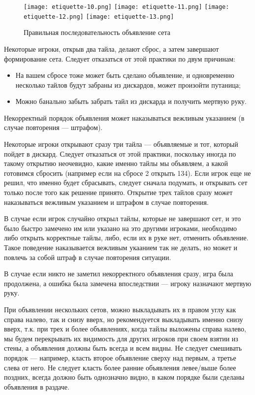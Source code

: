 \begin{figure}[H]
	\centering
	\texttt{[image: etiquette-10.png]}
	\texttt{[image: etiquette-11.png]}
	\texttt{[image: etiquette-12.png]}
	\texttt{[image: etiquette-13.png]}
	\caption{Правильная последовательность объявление сета}
\end{figure}

Некоторые игроки, открыв два тайла, делают сброс, а затем завершают формирование сета. Следует отказаться от этой практики по двум причинам:
\begin{itemize}
	\item На вашем сбросе тоже может быть сделано объявление, и одновременно несколько тайлов будут забраны из дискардов, может произойти путаница;
	\item Можно банально забыть забрать тайл из дискарда и получить мертвую руку.
\end{itemize}

Некорректный порядок объявления может наказываться вежливым указанием (в случае повторения --- штрафом).

Некоторые игроки открывают сразу три тайла --- объявляемые и тот, который пойдет в дискард. Следует отказаться от этой практики, поскольку иногда по такому открытию неочевидно, какие именно тайлы мы объявляем, а какой готовимся сбросить (например если на сбросе 2 открыть 134). Если игрок еще не решил, что именно будет сбрасывать, следует сначала подумать, и открывать сет только после того как решение принято. Открытие трех тайлов сразу может наказываться вежливым указанием и штрафом в случае повторения.

В случае если игрок случайно открыл тайлы, которые не завершают сет, и это было быстро замечено им или указано на это другими игроками, необходимо либо открыть корректные тайлы, либо, если их в руке нет, отменить объявление. Такое поведение наказывается вежливым укаанием так не делать, но может и повлечь за собой штраф в случае повторения ситуации.

В случае если никто не заметил некорректного объявления сразу, игра была продолжена, а ошибка была замечена впоследствии --- игроку назначают мертвую руку.

При объявлении нескольких сетов, можно выкладывать их в правом углу как справа налево, так и снизу вверх, но рекомендуется выкладывать именно снизу вверх, т.к. при трех и более объявлениях, когда тайлы выложены справа налево, мы будем перекрывать их видимость для других игроков при своем взятии из стены, а объявления должны быть всегда и всем видны. Не следует смешивать порядок --- например, класть второе объявление сверху над первым, а третье слева от него. Не следует класть более ранние объявления левее/выше более поздних, всегда должно быть однозначно видно, в каком порядке были сделаны объявления в раздаче.

